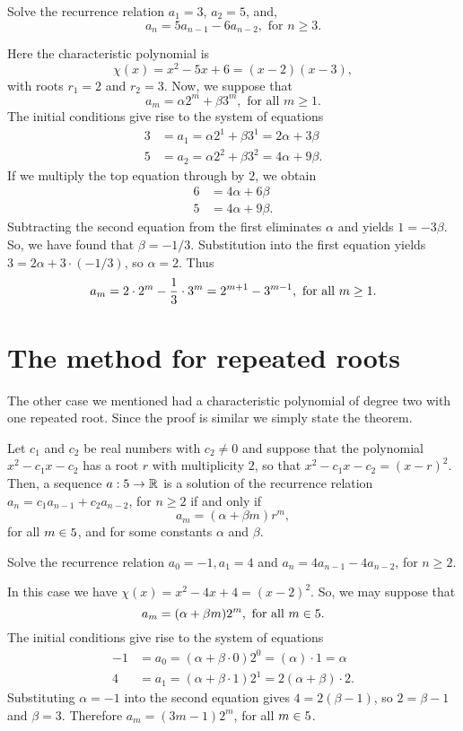 \begin{exmp}
 Solve the recurrence relation $a_1=3$, $a_2=5$, and, 
 \[
  a_n=5a_{n-1}-6a_{n-2}, \text{ for $n\geq 3$.}
 \]
\end{exmp}
\begin{soln}
 Here the characteristic polynomial is 
 \[
  \chi(x)=x^2-5x+6=(x-2)(x-3),
 \]
 with roots $r_1=2$ and $r_2=3$. Now, we suppose that
\[
 a_m=\alpha 2^m + \beta 3^m, \text{ for all $m\geq 1$.}
\] 
 The initial conditions give rise to the system of equations
 \begin{align*}
 3&=a_1=\alpha 2^1 + \beta 3^1 = 2\alpha + 3\beta \\
 5& =a_2 = \alpha 2^2 +\beta 3^2 = 4\alpha + 9\beta.
 \end{align*}
 If we multiply the top equation through by $2$, we obtain
 \begin{align*}
  6& =4\alpha + 6\beta \\
  5& = 4\alpha + 9\beta.
 \end{align*}
 Subtracting the second equation from the first eliminates $\alpha$ and yields $1=-3\beta$. 
 So, we have found that $\beta= -1/3$.
 Substitution into the first equation yields $3=2\alpha + 3\cdot (-1/3)$, so $\alpha = 2$.
 Thus 
\[
 a_m=2\cdot 2^m - {1\over 3}\cdot 3^m = 2^{m+1} - 3^{m-1}, \text{ for all $m\geq 1$.}
\]
\end{soln} 

\section{The method for repeated roots}
The other case we mentioned had a characteristic polynomial of degree two with one repeated root.
Since the proof is similar we simply state the theorem.

\begin{thm}
 Let $c_1$ and $c_2$ be real numbers with $c_2\neq 0$ and suppose that
 the polynomial $x^2-c_1x-c_2$ has a root $r$ with multiplicity $2$, so that $x^2-c_1x-c_2=(x-r)^2$.
 Then, a sequence $a:5\to \mathbb{R}$ is a solution of the
 recurrence relation $a_n=c_1a_{n-1}+c_2a_{n-2}$, for $n\geq 2$ if and only if 
\[
  a_m=(\alpha +\beta m) r^m,
\]
 for all $m\in 5$, and for some constants $\alpha$ and $\beta$.
\end{thm}

\begin{exmp}
 Solve the recurrence relation $a_0=-1, a_1=4$ and $a_n=4a_{n-1}-4a_{n-2}$, for $n\geq 2$.
\end{exmp}
\begin{soln}
 In this case we have $\chi(x)=x^2-4x+4=(x-2)^2$. So, we may suppose that 
\[
  a_m=(\alpha + \beta m)2^m, \text{ for all $m\in 5$.}
\]
 The initial conditions give rise to the system of equations
 \begin{align*}
  -1&=a_0=(\alpha +\beta \cdot 0)2^0 = (\alpha )\cdot 1= \alpha \\
  4 & = a_1 = (\alpha + \beta \cdot 1)2^1 = 2(\alpha + \beta)\cdot 2.
 \end{align*}
 Substituting $\alpha =-1$ into the second equation gives $4=2(\beta - 1)$, so $2=\beta - 1$ and $\beta = 3$.
 Therefore $a_m=(3m-1)2^m$, for all $m\in 5$.
\end{soln}

